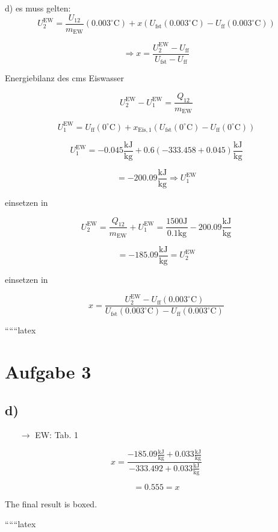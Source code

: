 d) es muss gelten: 
\[
U_2^{\text{EW}} = \frac{U_{12}}{m_{\text{EW}}}(0.003^\circ \text{C}) + x \left( U_{\text{fst}}(0.003^\circ \text{C}) - U_{\text{ff}}(0.003^\circ \text{C}) \right)
\]

\[
\Rightarrow x = \frac{U_2^{\text{EW}} - U_{\text{ff}}}{U_{\text{fst}} - U_{\text{ff}}}
\]

Energiebilanz des cms Eiswasser

\[
U_2^{\text{EW}} - U_1^{\text{EW}} = \frac{Q_{12}}{m_{\text{EW}}}
\]

\[
U_1^{\text{EW}} = U_{\text{ff}}(0^\circ \text{C}) + x_{\text{Eis},1} \left( U_{\text{fst}}(0^\circ \text{C}) - U_{\text{ff}}(0^\circ \text{C}) \right)
\]

\[
U_1^{\text{EW}} = -0.045 \frac{\text{kJ}}{\text{kg}} + 0.6 \left( -333.458 + 0.045 \right) \frac{\text{kJ}}{\text{kg}}
\]

\[
= -200.09 \frac{\text{kJ}}{\text{kg}} \Rightarrow U_1^{\text{EW}}
\]

einsetzen in

\[
U_2^{\text{EW}} = \frac{Q_{12}}{m_{\text{EW}}} + U_1^{\text{EW}} = \frac{1500 \text{J}}{0.1 \text{kg}} - 200.09 \frac{\text{kJ}}{\text{kg}}
\]

\[
= -185.09 \frac{\text{kJ}}{\text{kg}} = U_2^{\text{EW}}
\]

einsetzen in

\[
x = \frac{U_2^{\text{EW}} - U_{\text{ff}}(0.003^\circ \text{C})}{U_{\text{fst}}(0.003^\circ \text{C}) - U_{\text{ff}}(0.003^\circ \text{C})}
\]

``````latex


\section*{Aufgabe 3}



\subsection*{d)}

\begin{itemize}
    \item[$\rightarrow$] EW: Tab. 1
\end{itemize}

\[
x = \frac{-185.09 \frac{\text{kJ}}{\text{kg}} + 0.033 \frac{\text{kJ}}{\text{kg}}}{-333.492 + 0.033 \frac{\text{kJ}}{\text{kg}}}
\]

\[
= 0.555 = x
\]

The final result is boxed.

``````latex
